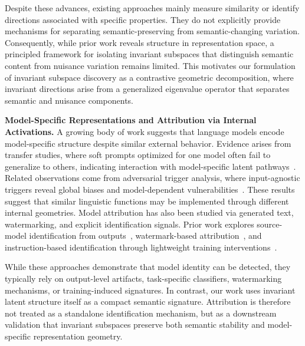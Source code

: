 Despite these advances, existing approaches mainly measure similarity or identify directions associated with specific properties. They do not explicitly provide mechanisms for separating semantic-preserving from semantic-changing variation. Consequently, while prior work reveals structure in representation space, a principled framework for isolating invariant subspaces that distinguish semantic content from nuisance variation remains limited. This motivates our formulation of invariant subspace discovery as a contrastive geometric decomposition, where invariant directions arise from a generalized eigenvalue operator that separates semantic and nuisance components.

\textbf{Model-Specific Representations and Attribution via Internal Activations.}
A growing body of work suggests that language models encode model-specific structure despite similar external behavior. Evidence arises from transfer studies, where soft prompts optimized for one model often fail to generalize to others, indicating interaction with model-specific latent pathways~\cite{lester-etal-2021-power}. Related observations come from adversarial trigger analysis, where input-agnostic triggers reveal global biases and model-dependent vulnerabilities~\cite{wallace-etal-2019-universal}. These results suggest that similar linguistic functions may be implemented through different internal geometries. 
Model attribution has also been studied via generated text, watermarking, and explicit identification signals. Prior work explores source-model identification from outputs~\cite{antoun-etal-2024-text}, watermark-based attribution~\cite{lu-etal-2024-source, dasgupta2025watermarking}, and instruction-based identification through lightweight training interventions~\cite{xu-etal-2024-instructional}.

While these approaches demonstrate that model identity can be detected, they typically rely on output-level artifacts, task-specific classifiers, watermarking mechanisms, or training-induced signatures. In contrast, our work uses invariant latent structure itself as a compact semantic signature. Attribution is therefore not treated as a standalone identification mechanism, but as a downstream validation that invariant subspaces preserve both semantic stability and model-specific representation geometry.













